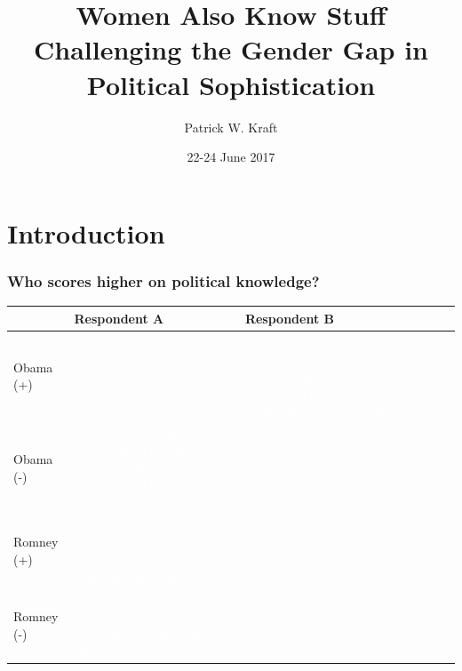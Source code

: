 \documentclass{beamer}
\author{Patrick W. Kraft}
\institute{7th Annual General Conference of the European Political Science Association Milan, Italy}
\title{Women Also Know Stuff\\{\large Challenging the Gender Gap in Political Sophistication}}
\date{22-24 June 2017}
\begin{document}
\frame{\titlepage}

\section{Introduction}

\begin{frame}%
\frametitle{Who scores higher on political knowledge?}
\begin{table}[ht]\footnotesize\centering
\begin{tabular}{l|p{4.5cm}|p{4.5cm}}
   \toprule
    & \textbf{Respondent A} & \textbf{Respondent B} \\ 
    \midrule
  Obama (+) & \textcolor{white}{I think he is honest, has good intentions.} & \textcolor{white}{He's got a hot wife. Sound mind. Bill Clinton, the best president we ever had, is voting for him. He's not in any type of scandal and is the perfect president for us now.} \\ \hdashline
  Obama (-) & \textcolor{white}{I don't feel he is up for the job, he doesn't really know how to get things accomplished from idea to actual reality.} &  \\ \hdashline
  Romney (+) & \textcolor{white}{He comes across as an honest person and I feel that financially he would be better for the country.} &  \\ \hdashline
  Romney (-) & \textcolor{white}{I am a moderate conservative and there are some things about anti-gay rights that I don't support.} & \textcolor{white}{Everything.} \\
    \bottomrule
 \end{tabular}
\end{table}
\end{frame}
\end{document}
